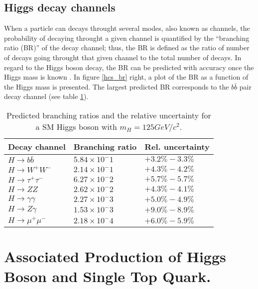 \subsection{Higgs decay channels}\label{sec:decays}

\noindent When a particle can decays throught several modes, also known as channels, the probability of decaying throught a given channel is quantified by the ``branching ratio (BR)'' of the decay channel; thus, the BR is defined as the ratio of number of decays going throught that given channel to the total number of decays. In regard to the Higgs boson decay, the BR can be predicted with accuracy once the Higgs mass is known \cite{riley, denner}. In figure \ref{hcs_br} right, a plot of the BR as a function of the Higgs mass is presented. The largest predicted BR corresponds to the $b\bar{b}$ pair decay channel (see table \ref{hdbr}). %

\begin{center}
\begin{table}[h]
\centering
\begin{tabular}{lll}\hline
Decay channel       & Branching ratio   & Rel. uncertainty\\\hline
$H\to b\bar{b}$     & $5.84\times10^-1$ & $+3.2\%-3.3\%$\\
$H\to W^+W^-$       & $2.14\times10^-1$ & $+4.3\%-4.2\%$\\
$H\to\tau^+\tau^-$  & $6.27\times10^-2$ & $+5.7\%-5.7\%$\\
$H\to ZZ$           & $2.62\times10^-2$ & $+4.3\%-4.1\%$\\
$H\to \gamma\gamma$ & $2.27\times10^-3$ & $+5.0\%-4.9\%$\\
$H\to Z\gamma$      & $1.53\times10^-3$ & $+9.0\%-8.9\%$\\
$H\to\mu^+\mu^-$    & $2.18\times10^-4$ & $+6.0\%-5.9\%$\\\hline
\end{tabular}
\caption[Predicted branching ratios for a SM Higgs boson with $m_H = 125$ GeV/c$^2$.]{Predicted branching ratios and the relative uncertainty for a SM Higgs boson with $m_H = 125GeV/c^2$.\cite{pdg}}\label{hdbr}
\end{table}
\end{center}
\section{Associated Production of Higgs Boson and Single Top Quark.}\label{sec:thq}

